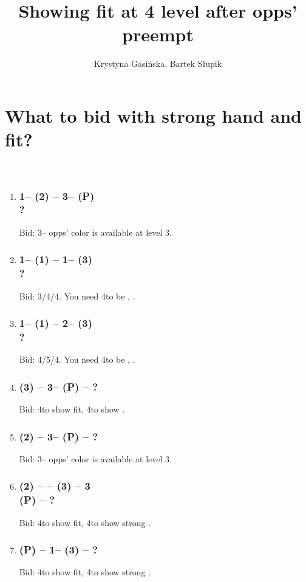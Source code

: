 \documentclass[12pt, a4paper]{article}
\title{Showing fit at 4 level after opps' preempt}
\author{Krystyna Gasińska, Bartek Słupik}
\begin{document}
\maketitle

\section{What to bid with strong hand and fit?}
\,\vspace{-10pt} %

\begin{enumerate}
    \item 
    \subsubsection*{1\minor -- (2\spades) -- 3\hearts -- (P) \\ ?}
Bid: 3\spades -- opps' color is available at level 3.
    \item 
    \subsubsection*{1\minor -- (1\hearts) -- 1\spades -- (3\hearts) \\ ?}
Bid: 3\spades/4\spades/4\hearts. You need 4\clubs to be \nat, \nf. \qq
    \item 
    \subsubsection*{1\hearts -- (1\spades) -- 2\diams -- (3\spades) \\ ?}
Bid: 4\diams/5\diams/4\spades. You need 4\clubs to be \nat, \nf.
    \item 
\subsubsection*{(3\diams) -- 3\major -- (P) -- ?}
Bid: 4\clubs to show fit, 4\diams to show \clubs.
\item 
\subsubsection*{(2\spades) -- 3\hearts -- (P) -- ?}
Bid: 3\spades -- opps' color is available at level 3.
\item 
\subsubsection*{(2\hearts) -- \dbl -- (3\hearts) -- 3\spades \\ (P) -- ?}
Bid: 4\clubs to show fit, 4\hearts to show strong \clubs.
\item 
\subsubsection*{(P) -- 1\hearts -- (3\spades) -- ?}
Bid: 4\clubs to show fit, 4\spades to show strong \clubs.
\end{enumerate}
\end{document}
